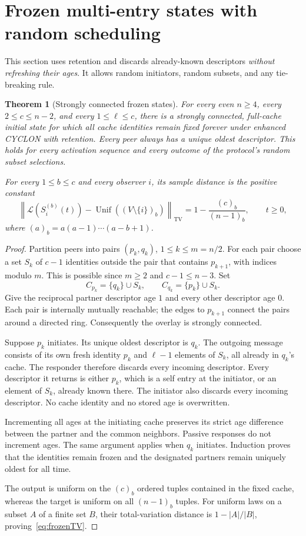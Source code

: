 \documentclass[11pt]{article}
\newtheorem{theorem}{Theorem}
\newcommand{\TV}{\mathrm{TV}}
\newcommand{\Unif}{\operatorname{Unif}}
\newcommand{\Law}{\mathcal L}
\begin{document}
\section{Frozen multi-entry states with random scheduling}

This section uses retention and discards already-known descriptors
\emph{without refreshing their ages}. It allows random initiators,
random subsets, and any tie-breaking rule.

\begin{theorem}[Strongly connected frozen states]
\label{thm:twins}
For every even $n\ge4$, every $2\le c\le n-2$, and every
$1\le\ell\le c$, there is a strongly connected, full-cache initial
state for which all cache identities remain fixed forever under
enhanced CYCLON with retention. Every peer always has a unique oldest
descriptor. This holds for every activation sequence and every outcome
of the protocol's random subset selections.

For every $1\le b\le c$ and every observer $i$, its sample distance is
the positive constant
\begin{equation}
 \left\|\Law(S_i^{(b)}(t))
 -\Unif((V\setminus\{i\})_b)\right\|_{\TV}
 =1-\frac{(c)_b}{(n-1)_b},
 \qquad t\ge0,
 \label{eq:frozenTV}
\end{equation}
where $(a)_b=a(a-1)\cdots(a-b+1)$.
\end{theorem}
\begin{proof}
Partition peers into pairs $(p_k,q_k)$, $1\le k\le m=n/2$.
For each pair choose a set $S_k$ of $c-1$ identities outside the pair
that contains $p_{k+1}$, with indices modulo $m$.
This is possible since $m\ge2$ and $c-1\le n-3$.
Set
\[
 C_{p_k}=\{q_k\}\cup S_k,\qquad
 C_{q_k}=\{p_k\}\cup S_k.
\]
Give the reciprocal partner descriptor age $1$ and every other
descriptor age $0$. Each pair is internally mutually reachable;
the edges to $p_{k+1}$ connect the pairs around a directed ring.
Consequently the overlay is strongly connected.

Suppose $p_k$ initiates. Its unique oldest descriptor is $q_k$.
The outgoing message consists of its own fresh identity $p_k$ and
$\ell-1$ elements of $S_k$, all already in $q_k$'s cache. The responder
therefore discards every incoming descriptor.
Every descriptor it returns is either $p_k$, which is a self entry
at the initiator, or an element of $S_k$, already known there.
The initiator also discards every incoming descriptor. No cache
identity and no stored age is overwritten.

Incrementing all ages at the initiating cache preserves its strict
age difference between the partner and the common neighbors. Passive
responses do not increment ages. The same argument applies when
$q_k$ initiates. Induction proves that the identities remain frozen
and the designated partners remain uniquely oldest for all time.

The output is uniform on the $(c)_b$ ordered tuples contained in the
fixed cache, whereas the target is uniform on all $(n-1)_b$ tuples.
For uniform laws on a subset $A$ of a finite set $B$, their
total-variation distance is $1-|A|/|B|$, proving~\eqref{eq:frozenTV}.
\end{proof}
\end{document}
